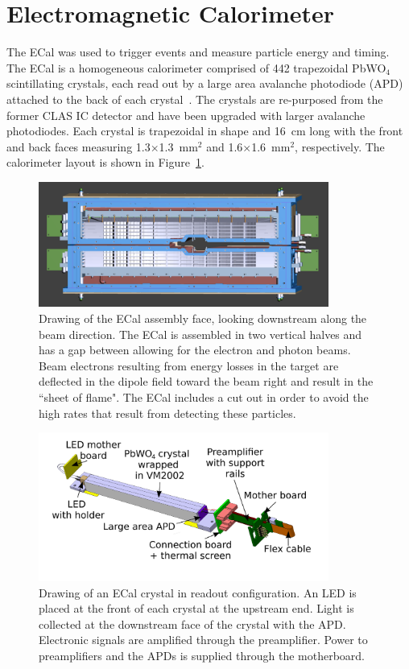 \section{Electromagnetic Calorimeter}
The ECal was used to trigger events and measure particle energy and timing. The ECal is a homogeneous calorimeter comprised of 442 trapezoidal PbWO$_4$ scintillating crystals, each read out by a large area avalanche photodiode (APD) attached to the back of each crystal~\cite{Balossino201789}. The crystals are re-purposed from the former CLAS IC detector and have been upgraded with larger avalanche photodiodes. Each crystal is trapezoidal in shape and 16~cm long with the front and back faces measuring 1.3$\times$1.3~mm$^2$ and 1.6$\times$1.6~mm$^2$, respectively. The calorimeter layout is shown in Figure~\ref{Figure:ecalface}. 

\begin{figure}[h]
  \centering
      \includegraphics[width=0.85\textwidth]{pics/experiment/ecalface.png}
  \caption[Drawing of the ECal assembly face]{Drawing of the ECal assembly face, looking downstream along the beam direction. The ECal is assembled in two vertical halves and has a gap between allowing for the electron and photon beams. Beam electrons resulting from energy losses in the target are deflected in the dipole field toward the beam right and result in the ``sheet of flame". The ECal includes a cut out in order to avoid the high rates that result from detecting these particles.}
  \label{Figure:ecalface}
\end{figure}

\begin{figure}[h]
  \centering
      \includegraphics[width=0.85\textwidth]{pics/experiment/crystal.png}
  \caption[Single ECal module]{Drawing of an ECal crystal in readout configuration. An LED is placed at the front of each crystal at the upstream end. Light is collected at the downstream face of the crystal with the APD. Electronic signals are amplified through the preamplifier. Power to preamplifiers and the APDs is supplied through the motherboard.}
  \label{Figure:crystal}
\end{figure}


